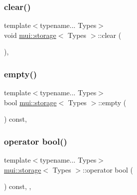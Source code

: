 \subsubsection{\texorpdfstring{clear()}{clear()}}
{\footnotesize\ttfamily template$<$typename... Types$>$ \\
void \hyperlink{structmui_1_1storage}{mui\+::storage}$<$ Types $>$\+::clear (\begin{DoxyParamCaption}{ }\end{DoxyParamCaption})\hspace{0.3cm}{\ttfamily [inline]}, {\ttfamily [noexcept]}}

\mbox{\label{structmui_1_1storage_adcf21fcd6f81c02f8cf98f5055975dca}} 
\subsubsection{\texorpdfstring{empty()}{empty()}}
{\footnotesize\ttfamily template$<$typename... Types$>$ \\
bool \hyperlink{structmui_1_1storage}{mui\+::storage}$<$ Types $>$\+::empty (\begin{DoxyParamCaption}{ }\end{DoxyParamCaption}) const\hspace{0.3cm}{\ttfamily [inline]}, {\ttfamily [noexcept]}}

\mbox{\label{structmui_1_1storage_a8c4b21ae13ecbcb7fe8977a20a4d5a14}} 
\subsubsection{\texorpdfstring{operator bool()}{operator bool()}}
{\footnotesize\ttfamily template$<$typename... Types$>$ \\
\hyperlink{structmui_1_1storage}{mui\+::storage}$<$ Types $>$\+::operator bool (\begin{DoxyParamCaption}{ }\end{DoxyParamCaption}) const\hspace{0.3cm}{\ttfamily [inline]}, {\ttfamily [explicit]}, {\ttfamily [noexcept]}}

\mbox{\label{structmui_1_1storage_a72090012dadb313e33077b106243376c}} 
